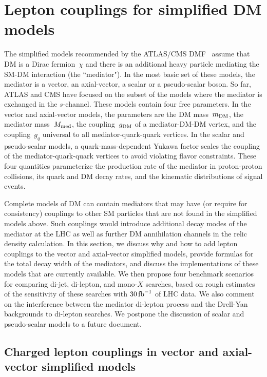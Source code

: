 \documentclass[a4paper, 11pt,notoc]{article}
\newcommand{\mDM}{\ensuremath{m_{\rm{DM}}}\xspace}
\newcommand{\mmed}{\ensuremath{M_{\rm{med}}}\xspace}
\newcommand{\gDM}{\ensuremath{g_{\rm{DM}}}\xspace}
\newcommand{\gq}{\ensuremath{g_q}\xspace}
\begin{document}

\section{Lepton couplings for simplified DM models}
\label{sec:models}

The simplified models recommended by the ATLAS/CMS DMF~\cite{Abercrombie:2015wmb} assume that DM is a Dirac fermion~$\chi$ and there is an additional heavy particle mediating the SM-DM interaction (the ``mediator"). In the most basic set of these models, the mediator is a vector, an axial-vector, a scalar or a pseudo-scalar boson. So far, ATLAS and CMS have focused on the subset of the models where the mediator is exchanged in the $s$-channel. These models contain four free parameters. In the vector and axial-vector models, the parameters are the DM mass~$\mDM$, the mediator mass~$\mmed$, the coupling~$\gDM$ of a mediator-DM-DM vertex, and the coupling~$\gq$ universal to all mediator-quark-quark vertices. In the scalar and pseudo-scalar models, a quark-mass-dependent Yukawa factor scales the coupling of the mediator-quark-quark vertices to avoid violating flavor constraints. These four quantities parameterize the production rate of the mediator in proton-proton collisions, its quark and DM decay rates, and the kinematic distributions of signal events.

Complete models of DM can contain mediators that may have (or require for consistency) couplings to other SM particles that are not found in the simplified models above. Such couplings would introduce additional decay modes of the mediator at the LHC as well as further DM annihilation channels in the relic density calculation. In this section, we discuss why and how to add lepton couplings to the vector and axial-vector simplified models, provide formulas for the total decay width of the mediators, and discuss the implementations of these models that are currently available. We then propose four benchmark scenarios for comparing di-jet, di-lepton, and mono-$X$ searches, based on rough estimates of the sensitivity of these searches with $30 \, {\rm fb}^{-1}$ of LHC data. We also comment on the interference between the mediator di-lepton process and the Drell-Yan backgrounds to di-lepton searches. We postpone the discussion of scalar and pseudo-scalar models to a future document. 


\subsection{Charged lepton couplings in vector and axial-vector simplified models}
\label{sub:vecAxial}
\end{document}
